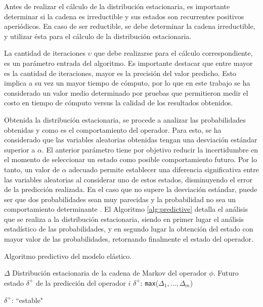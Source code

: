 \normalsize{Antes de realizar el c\'alculo de la distribuci\'on estacionaria, es importante determinar si la cadena es irreductible y sus estados son recurrentes positivos aperi\'odicos. En caso de ser reductible, se debe determinar la cadena irreductible, y utilizar \'esta para el c\'alculo de la distribuci\'on estacionaria.}

La cantidad de iteraciones $\upsilon$ que debe realizarse para el c\'alculo correspondiente, es un par\'ametro entrada del algoritmo. Es importante destacar que entre mayor es la cantidad de iteraciones, mayor es la precisi\'on del valor predicho. Esto implica a su vez un mayor tiempo de c\'omputo, por lo que en este trabajo se ha considerado un valor medio determinado por pruebas que permitieron medir el costo en tiempo de c\'omputo versus la calidad de los resultados obtenidos.



Obtenida la distribuci\'on estacionaria, se procede a analizar las probabilidades obtenidas y como es el comportamiento del operador. Para esto, se ha considerado que las variables aleatorias obtenidas tengan una desviaci\'on est\'andar superior a $\alpha$. El anterior par\'ametro tiene por objetivo reducir la incertidumbre en el momento de seleccionar un estado como posible comportamiento futuro. \normalsize{Por lo tanto, un valor de $\alpha$ adecuado permite establecer una diferencia significativa entre las variables aleatorias al considerar uno de estos estados, disminuyendo el error de la predicci\'on realizada.} En el caso que no supere la desviaci\'on est\'andar, puede ser que dos probabilidades sean muy parecidas y la probabilidad no sea un comportamiento determinante \citep{soong2004fundamentals}. El Algoritmo \ref{alg:predictive} detalla el an\'alisis que se realiza a la distribuci\'on estacionaria, siendo en primer lugar el an\'alisis estad\'istico de las probabilidades, y en segundo lugar la obtenci\'on del estado con mayor valor de las probabilidades, retornando finalmente el estado del operador.

\begin{algorithm}[t]
	\caption{Algoritmo predictivo del modelo el\'astico.}
	\label{alg:predictive}
	\begin{algorithmic}[1]
	\REQUIRE$\Delta$ Distribuci\'on estacionaria de la cadena de Markov del operador $\phi$.
	\ENSURE Futuro estado $\delta^{+}$ de la predicci\'on del operador $i$
		\RETURN $\delta^{+}$: \texttt{max}({$\Delta_1,\ldots,\Delta_m$})

	\ELSE
		\RETURN $\delta^{+}$: ``estable"
	\ENDIF
	\end{algorithmic}
\end{algorithm}

